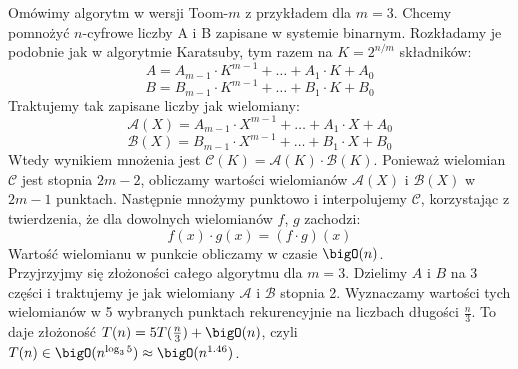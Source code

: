 Omówimy algorytm w wersji Toom-\(m\) z przykładem dla \( m = 3 \). Chcemy pomnożyć \(n\)-cyfrowe liczby A i B zapisane w systemie binarnym.
Rozkładamy je podobnie jak w algorytmie Karatsuby, tym razem na \( K = 2^{n / m} \) składników:
\[
	A = A_{m-1} \cdot K^{m-1} + \dots + A_1 \cdot K + A_0
\]
\[
	B = B_{m-1} \cdot K^{m-1} + \dots + B_1 \cdot K + B_0
\]
Traktujemy tak zapisane liczby jak wielomiany:
\[
	\mathcal{A}(X) = A_{m-1} \cdot X^{m-1} + \dots + A_1 \cdot X + A_0
\]
\[
	\mathcal{B}(X) = B_{m-1} \cdot X^{m-1} + \dots + B_1 \cdot X + B_0
\]
Wtedy wynikiem mnożenia jest \( \mathcal{C}(K) = \mathcal{A}(K) \cdot \mathcal{B}(K) \). Ponieważ wielomian \( \mathcal{C} \) jest stopnia \( 2m-2 \), obliczamy wartości wielomianów \( \mathcal{A}(X) \) i \( \mathcal{B}(X) \) w \( 2m-1 \) punktach.
Następnie mnożymy punktowo i interpolujemy \( \mathcal{C} \), korzystając z twierdzenia, że dla dowolnych wielomianów \( f \), \( g \) zachodzi:
\[
	f(x) \cdot g(x) = (f \cdot g)(x)
\]
Wartość wielomianu w punkcie obliczamy w czasie \( \bigO(n) \). \\
Przyjrzyjmy się złożoności całego algorytmu dla \( m = 3 \). Dzielimy \( A \) i \( B \) na 3 części i traktujemy je jak wielomiany \( \mathcal{A} \) i \( \mathcal{B} \) stopnia 2. Wyznaczamy wartości tych wielomianów w 5 wybranych punktach rekurencyjnie na liczbach długości \( \frac{n}{3} \). To daje złożoność \( T(n) = 5T(\frac{n}{3}) + \bigO(n) \), czyli \( T(n) \in \bigO(n^{\log_3 5}) \approx \bigO(n^{1.46}) \).